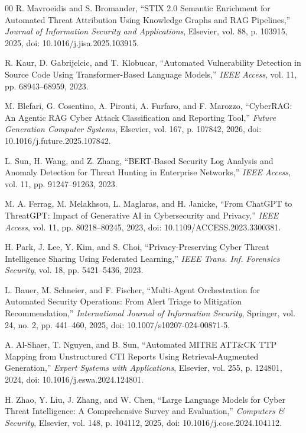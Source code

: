 \documentclass[conference]{IEEEtran}
\begin{document}
\begin{thebibliography}{00}
R. Mavroeidis and S. Bromander,
``STIX 2.0 Semantic Enrichment for Automated Threat Attribution Using
Knowledge Graphs and RAG Pipelines,''
\textit{Journal of Information Security and Applications}, Elsevier,
vol. 88, p. 103915, 2025, doi: 10.1016/j.jisa.2025.103915.

R. Kaur, D. Gabrijelcic, and T. Klobucar,
``Automated Vulnerability Detection in Source Code Using Transformer-Based
Language Models,''
\textit{IEEE Access}, vol. 11, pp. 68943--68959, 2023.

M. Blefari, G. Cosentino, A. Pironti, A. Furfaro, and F. Marozzo,
``CyberRAG: An Agentic RAG Cyber Attack Classification and Reporting
Tool,''
\textit{Future Generation Computer Systems}, Elsevier, vol. 167,
p. 107842, 2026, doi: 10.1016/j.future.2025.107842.

L. Sun, H. Wang, and Z. Zhang,
``BERT-Based Security Log Analysis and Anomaly Detection for Threat Hunting
in Enterprise Networks,''
\textit{IEEE Access}, vol. 11, pp. 91247--91263, 2023.

M. A. Ferrag, M. Melakhsou, L. Maglaras, and H. Janicke,
``From ChatGPT to ThreatGPT: Impact of Generative AI in Cybersecurity and
Privacy,''
\textit{IEEE Access}, vol. 11, pp. 80218--80245, 2023,
doi: 10.1109/ACCESS.2023.3300381.

H. Park, J. Lee, Y. Kim, and S. Choi,
``Privacy-Preserving Cyber Threat Intelligence Sharing Using Federated
Learning,''
\textit{IEEE Trans. Inf. Forensics Security}, vol. 18,
pp. 5421--5436, 2023.

L. Bauer, M. Schneier, and F. Fischer,
``Multi-Agent Orchestration for Automated Security Operations: From
Alert Triage to Mitigation Recommendation,''
\textit{International Journal of Information Security}, Springer,
vol. 24, no. 2, pp. 441--460, 2025,
doi: 10.1007/s10207-024-00871-5.

A. Al-Shaer, T. Nguyen, and B. Sun,
``Automated MITRE ATT\&CK TTP Mapping from Unstructured CTI Reports
Using Retrieval-Augmented Generation,''
\textit{Expert Systems with Applications}, Elsevier, vol. 255,
p. 124801, 2024, doi: 10.1016/j.eswa.2024.124801.

H. Zhao, Y. Liu, J. Zhang, and W. Chen,
``Large Language Models for Cyber Threat Intelligence: A Comprehensive
Survey and Evaluation,''
\textit{Computers \& Security}, Elsevier, vol. 148, p. 104112, 2025,
doi: 10.1016/j.cose.2024.104112.


\end{thebibliography}
\end{document}
